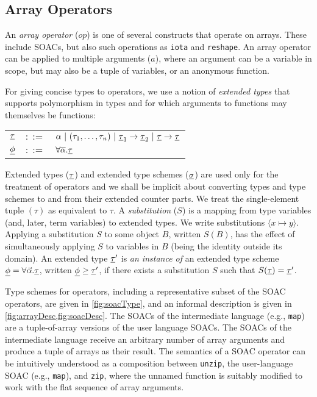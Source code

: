 \subsection{Array Operators}

An \textit{array operator} ($op$) is one of several constructs that
operate on arrays.  These include SOACs, but also such operations as
\lstinline{iota} and \lstinline{reshape}.  An array operator can be
applied to multiple arguments ($a$), where an argument can be a
variable in scope, but may also be a tuple of variables, or an
anonymous function.

For giving concise types to operators, we use a notion of \emph{extended
types} that supports polymorphism in types and for which arguments to
functions may themselves be functions:

\begin{tabular}{lrl}
$\underline{\tau}$ & $::=$ & $\alpha~|~(\tau_{1}, \ldots, \tau_{n})~|~\underline{\tau}_1 \rightarrow \underline{\tau}_2~|~\underline{\tau} \rightarrow \underline{\tau}$ \\
$\underline{\phi}$ & $::=$ & $\forall\overline{\alpha}.\underline{\tau}$
\end{tabular}

\noindent Extended types ($\underline{\tau}$) and extended type schemes
($\underline{\sigma}$) are used only for the treatment of operators and we
shall be implicit about converting types and type schemes to and from
their extended counter parts.  We treat the single-element tuple
$(\tau)$ as equivalent to $\tau$.  A \emph{substitution} ($S$) is a
mapping from type variables (and, later, term variables) to extended
types.  We write substitutions $\langle x\mapsto y\rangle$.  Applying
a substitution $S$ to some object $B$, written $S(B)$, has the effect
of simultaneously applying $S$ to variables in $B$ (being the identity
outside its domain).  An extended type $\underline{\tau}'$ is \emph{an instance
  of} an extended type scheme $\underline{\phi} = \forall \vec{\alpha}.\underline{\tau}$,
written $\underline{\phi} \geq \underline{\tau}'$, if there exists a substitution $S$ such
that $S(\underline{\tau}) = \underline{\tau}'$.

Type schemes for operators, including a representative subset of the
SOAC operators, are given in \cref{fig:soacType}, and an informal
description is given in \cref{fig:arrayDesc,fig:soacDesc}.  The SOACs
of the intermediate language (e.g., \lstinline{map}) are a
tuple-of-array versions of the user language SOACs. The SOACs of the
intermediate language receive an arbitrary number of array arguments
and produce a tuple of arrays as their result.  The semantics of a
SOAC operator can be intuitively understood as a composition between
\lstinline{unzip}, the user-language SOAC (e.g., \lstinline{map}), and
\lstinline{zip}, where the unnamed function is suitably modified to
work with the flat sequence of array arguments.

